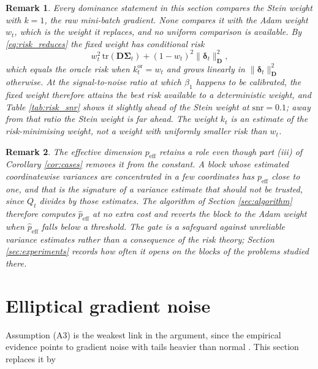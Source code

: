 \documentclass[pdflatex,sn-mathphys-num]{sn-jnl}%
\theoremstyle{thmstyleone}%
\theoremstyle{thmstyletwo}%
\newtheorem{remark}{Remark}%
\theoremstyle{thmstylethree}%
\newenvironment{revblock}{}{}
\newcommand{\peff}{p_{\mathrm{eff}}}
\newcommand{\tr}{\mathrm{tr}}
\begin{document}
\begin{remark}
\label{rem:benchmark}
Every dominance statement in this section compares the Stein weight with $k=1$, the raw mini-batch gradient. None compares it with the Adam weight $w_t$, which is the weight it replaces, and no uniform comparison is available. By \eqref{eq:risk_reduces} the fixed weight has conditional risk
\begin{equation}
\label{eq:fixed_risk}
w_t^{2}\,\tr(\bm D\bm\Sigma_t)+(1-w_t)^{2}\|\bm\delta_t\|^2_{\bm D},
\end{equation}
which equals the oracle risk when $k^{\mathrm{or}}_t=w_t$ and grows linearly in $\|\bm\delta_t\|^2_{\bm D}$ otherwise. At the signal-to-noise ratio at which $\beta_1$ happens to be calibrated, the fixed weight therefore attains the best risk available to a deterministic weight, and Table \ref{tab:risk_snr} shows it slightly ahead of the Stein weight at $\mathrm{snr}=0.1$; away from that ratio the Stein weight is far ahead. The weight $k_t$ is an estimate of the risk-minimising weight, not a weight with uniformly smaller risk than $w_t$.
\end{remark}

\begin{remark}
\label{rem:gate}
The effective dimension $\peff$ retains a role even though part (iii) of Corollary \ref{cor:cases} removes it from the constant. A block whose estimated coordinatewise variances are concentrated in a few coordinates has $\peff$ close to one, and that is the signature of a variance estimate that should not be trusted, since $Q_t$ divides by those estimates. The algorithm of Section \ref{sec:algorithm} therefore computes $\hat\peff$ at no extra cost and reverts the block to the Adam weight when $\hat\peff$ falls below a threshold. The gate is a safeguard against unreliable variance estimates rather than a consequence of the risk theory; Section \ref{sec:experiments} records how often it opens on the blocks of the problems studied there.
\end{remark}

\section{Elliptical gradient noise}
\label{sec:elliptical}

Assumption (A3) is the weakest link in the argument, since the empirical evidence points to gradient noise with tails heavier than normal \cite{simsekli2019, panigrahi2019, gurbuzbalaban2021}. This section replaces it by
\end{document}
